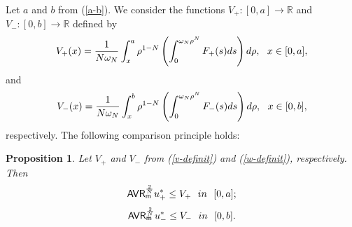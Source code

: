 \documentclass[11pt, reqno]{amsart}
\newtheorem{proposition}{Proposition}[section]
\numberwithin{equation}{section}
\begin{document}
Let $a$ and $b$  from {\rm (\ref{a-b})}. We consider the functions $V_+:[0,a]\to \mathbb R$ and $V_-:[0,b]\to \mathbb R$ defined by 
\begin{equation}\label{v-definit}
	V_+(x)=\frac{1}{N\omega_N}\int_{x}^a \rho^{1-N}\left(\int_0^{\omega_N \rho^N}F_+(s){\rm d}s\right){\rm d}\rho,\ \ x\in [0,a],
	\end{equation}
	and
	\begin{equation}\label{w-definit}
		V_-(x)=\frac{1}{N\omega_N}\int_{x}^b \rho^{1-N}\left(\int_0^{\omega_N \rho^N}F_-(s){\rm d}s\right){\rm d}\rho,\ \ x\in [0,b],
				\end{equation}
		respectively. The following comparison principle holds: 
		
		\begin{proposition} \label{talenti-result-0}
			Let  $V_+$ and $V_-$ from {\rm (\ref{v-definit})} and {\rm (\ref{w-definit})}, respectively. Then
			\begin{equation}\label{1-compar-0}
				{\sf AVR}_ {\sf m}^\frac{2}{N}	u_+^*\leq V_+\ \ {in}\ \ [0,a];
			\end{equation}
			\begin{equation}\label{2-compar-0}
				{\sf AVR}_ {\sf m}^\frac{2}{N}	u_-^*\leq V_-\ \ {in}\ \ [0,b].
			\end{equation}
		\end{proposition}
\end{document}
